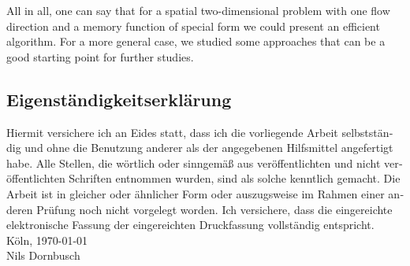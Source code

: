\documentclass[12pt,a4paper,twoside, open=right]{scrreprt}
\theoremstyle{definition}
\theoremstyle{plain}
\begin{document}
\par 
All in all, one can say that for a spatial two-dimensional problem with one flow direction and a memory function of special form we could present an efficient algorithm. For a more general case, we studied some approaches that can be a good starting point for further studies.
\setcounter{lofdepth}{2}
\listoffigures
\newpage
{}
\setcounter{lofdepth}{2}
\listoftables
\newpage
{}

{}
\newpage
\begin{otherlanguage}{ngerman}
\chapter*{Eigenständigkeitserklärung}
Hiermit versichere ich an Eides statt, dass ich die vorliegende Arbeit selbstständig und ohne die Benutzung anderer als der angegebenen  Hilfsmittel  angefertigt  habe.  
Alle  Stellen,  die  wörtlich  oder  sinngemäß  aus  veröffentlichten  und  nicht  veröffentlichten  Schriften  entnommen  wurden,  sind  als  solche  kenntlich  gemacht.  
Die  Arbeit  ist  in  gleicher  oder  ähnlicher  Form  oder  auszugsweise  im  Rahmen  einer  anderen  Prüfung  noch  nicht  vorgelegt  worden. 
Ich  versichere,  dass  die  eingereichte    elektronische    Fassung    der    eingereichten    Druckfassung    vollständig    entspricht.
\\[\bigskipamount]
Köln, \today
\\[2\bigskipamount]
Nils Dornbusch
\end{otherlanguage}
\end{document}
